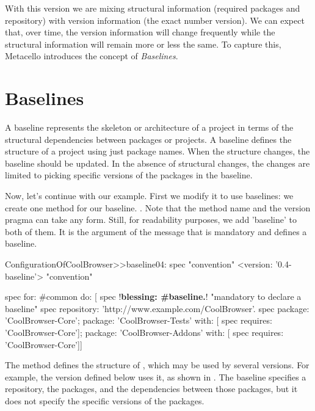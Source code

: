 \documentclass[a4paper,10pt,twoside]{book}
\begin{document}
With this version we are mixing structural information (required packages and repository) with version information (the exact number version). 
We can expect that, over time, the version information will change frequently while the structural information will remain more or less the same. 
To capture this, Metacello introduces the concept of \emph{Baselines}.


\section{Baselines}
A baseline represents the skeleton or architecture of a project in terms of the structural dependencies between packages or projects. A baseline defines the structure of a project using just package names. When the structure changes, the baseline should be updated. In the absence of structural changes, the changes are limited to picking specific versions of the packages in the baseline.

Now, let's continue with our example. First we modify it to use baselines: we create one method for our baseline.
. Note that the method name and the version pragma can take any form. Still, for readability purposes, we add 'baseline' to both of them.
It is the argument of the  message that is mandatory and defines a baseline. 
\needspace{17ex}
\begin{code}{}
ConfigurationOfCoolBrowser>>baseline04: spec 				"convention"
       <version: '0.4-baseline'> 					              		"convention"
       
       spec for: #common do: [
              spec !\textbf{blessing: \#baseline.}!    "mandatory to declare a baseline"
              spec repository: 'http://www.example.com/CoolBrowser'.
              spec 
                  package: 'CoolBrowser-Core';
                  package: 'CoolBrowser-Tests' with: [ spec requires: 'CoolBrowser-Core'];
                  package: 'CoolBrowser-Addons' with: [ spec requires: 'CoolBrowser-Core']]
\end{code}

The method  defines the structure of ,
which may be used by several versions. For example, the version  defined below uses it, as shown in .  The baseline specifies a repository, the packages, and the  dependencies between those packages, but it does not specify the specific versions of the packages.  
\end{document}
